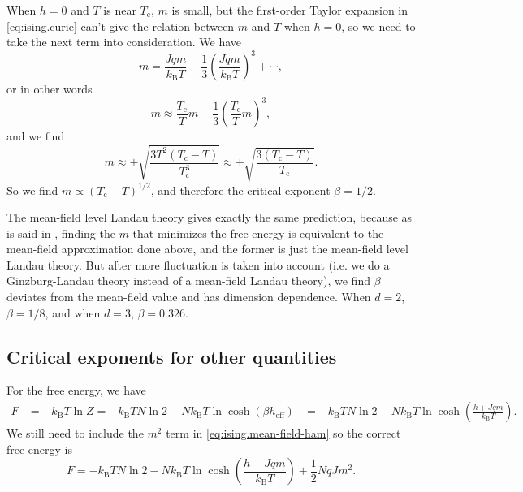 \documentclass[hyperref, a4paper]{article}
\def\\{}%
\newcommand*{\Tc}{T_{\text{c}}}
\newcommand*{\kB}{k_{\text{B}}}
\begin{document}
When $h = 0$ and $T$ is near $\Tc$, 
$m$ is small,
but the first-order Taylor expansion in \eqref{eq:ising.curie} 
can't give the relation between $m$ and $T$ when $h = 0$, 
so we need to take the next term into consideration. 
We have 
\[
    m = \frac{J q m}{\kB T} - \frac{1}{3} \left(
        \frac{J q m}{\kB T}
    \right)^3 + \cdots, 
\]
or in other words 
\[
    m \approx \frac{\Tc}{T} m - \frac{1}{3} \left(
        \frac{\Tc}{T} m
    \right)^3,
\]
and we find 
\begin{equation}
    m \approx \pm \sqrt{
        \frac{3 T^2 (\Tc - T)}{\Tc^3} 
    } \approx \pm \sqrt{
        \frac{3 (\Tc - T)}{\Tc} 
    }.
    \label{eq:ising.mf.m}
\end{equation}
So we find $m \propto (\Tc - T)^{1/2}$, 
and therefore the critical exponent $\beta = 1/2$.

The mean-field level Landau theory gives exactly the same prediction, 
because as is said in , 
finding the $m$ that minimizes the free energy 
is equivalent to the mean-field approximation done above, 
and the former is just the mean-field level Landau theory. 
But after more fluctuation is taken into account 
(i.e. we do a Ginzburg-Landau theory instead of a mean-field Landau theory), 
we find $\beta$ deviates from the mean-field value and 
has dimension dependence.
When $d = 2$, $\beta = 1/8$, 
and when $d = 3$, $\beta = 0.326$.

\subsection{Critical exponents for other quantities}

For the free energy, we have 
\begin{equation}
    \begin{aligned}
        F &= - \kB T \ln Z = - \kB T N \ln 2 - N \kB T \ln \cosh (\beta h_{\text{eff}}) \\
        &= - \kB T N \ln 2 - N \kB T \ln \cosh (
            \frac{h + Jq m}{\kB T}
        ).
    \end{aligned}
\end{equation}
We still need to include the $m^2$ term in \eqref{eq:ising.mean-field-ham}
so the correct free energy is 
\begin{equation}
    F = - \kB T N \ln 2 - N \kB T \ln \cosh (
        \frac{h + Jq m}{\kB T}
    ) + \frac{1}{2} N q J m^2.
\end{equation}
\end{document}
